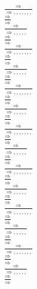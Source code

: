 \documentclass[11pt]{article}
\begin{document}
\begin{center}
\\$\frac{\Rightarrow }{\Rightarrow , , , , , , , }$
\bigskip
\\$\frac{\Rightarrow }{\Rightarrow }$
\bigskip
\\$\frac{\Rightarrow }{\Rightarrow , , , , , }$
\bigskip
\\$\frac{\Rightarrow }{\Rightarrow }$
\bigskip
\\$\frac{\Rightarrow }{\Rightarrow , , , , , , , }$
\bigskip
\\$\frac{\Rightarrow }{\Rightarrow }$
\bigskip
\\$\frac{\Rightarrow }{\Rightarrow , , , , , }$
\bigskip
\\$\frac{\Rightarrow }{\Rightarrow }$
\bigskip
\\$\frac{\Rightarrow }{\Rightarrow , , , , , , , }$
\bigskip
\\$\frac{\Rightarrow }{\Rightarrow }$
\bigskip
\\$\frac{\Rightarrow }{\Rightarrow , , , , , }$
\bigskip
\\$\frac{\Rightarrow }{\Rightarrow }$
\bigskip
\\$\frac{\Rightarrow }{\Rightarrow , , , , , , , }$
\bigskip
\\$\frac{\Rightarrow }{\Rightarrow }$
\bigskip
\\$\frac{\Rightarrow }{\Rightarrow , , , , , }$
\bigskip
\\$\frac{\Rightarrow }{\Rightarrow }$
\bigskip
\\$\frac{\Rightarrow }{\Rightarrow , , , , , , , }$
\bigskip
\\$\frac{\Rightarrow }{\Rightarrow }$
\bigskip
\\$\frac{\Rightarrow }{\Rightarrow , , , , , }$
\bigskip
\\$\frac{\Rightarrow }{\Rightarrow }$
\bigskip
\\$\frac{\Rightarrow }{\Rightarrow , , , , , , , }$
\bigskip
\\$\frac{\Rightarrow }{\Rightarrow }$
\bigskip
\\$\frac{\Rightarrow }{\Rightarrow , , , , , }$
\bigskip
\\$\frac{\Rightarrow }{\Rightarrow }$
\bigskip
\\$\frac{\Rightarrow }{\Rightarrow , , , , , , , }$
\bigskip
\\$\frac{\Rightarrow }{\Rightarrow }$
\bigskip
\\$\frac{\Rightarrow }{\Rightarrow , , , , , }$
\bigskip
\\$\frac{\Rightarrow }{\Rightarrow }$
\bigskip

\end{center}
\end{document}
